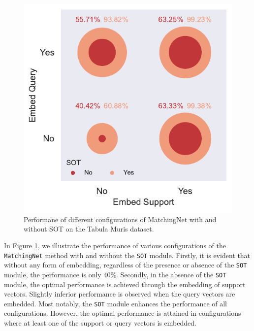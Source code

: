 \begin{figure}
    \centering
    \includegraphics[width=0.75\columnwidth]{../figures/sot-interaction-scatter.pdf}
    \caption{Performane of different configurations of MatchingNet with and without SOT on the Tabula Muris dataset.}
    \label{fig:sot-interaction-scatter}
\end{figure}

In Figure \ref{fig:sot-interaction-scatter}, we illustrate the performance of various 
configurations of the \texttt{MatchingNet} method with and without the \texttt{SOT} 
module. Firstly, it is evident that without any form of embedding, regardless of the presence or 
absence of the \texttt{SOT} module, the performance is only 40\%. Secondly, in the absence of the 
\texttt{SOT} module, the optimal performance is achieved through the embedding of support vectors. 
Slightly inferior performance is observed when the query vectors are embedded. 
Most notably, the \texttt{SOT} module enhances the performance of all configurations. 
However, the optimal performance is attained in configurations where at least one of the 
support or query vectors is embedded.
